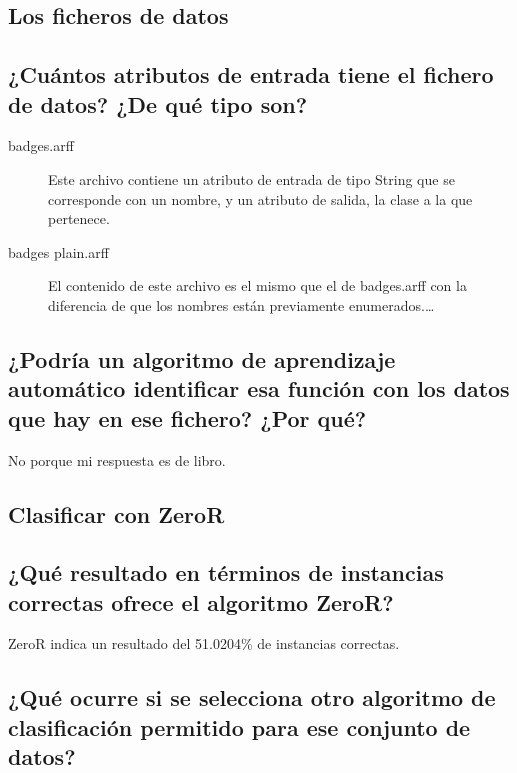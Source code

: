 \documentclass[12pt]{article}
\begin{document}
\tableofcontents

\newpage

\begin{center}
\section{Los ficheros de datos}
\end{center}

\subsection{\small ¿Cuántos atributos de entrada tiene el fichero de datos?
¿De qué tipo son?}

\begin{description}
  \item[badges.arff] Este archivo contiene un atributo de entrada de tipo String que se corresponde con un nombre, y un atributo de salida, la clase a la que pertenece.
  \item[badges plain.arff] El contenido de este archivo es el mismo que el de  badges.arff con la diferencia de que los nombres están previamente enumerados.\ldots
\end{description}

\subsection{\small ¿Podrí­a un algoritmo de aprendizaje automático identificar esa
función con los datos que hay en ese fichero? ¿Por qué?}

No porque mi respuesta es de libro.

\newpage

\begin{center}
\section{Clasificar con ZeroR}
\end{center}

\subsection{\small ¿Qué resultado en términos de instancias correctas ofrece el algoritmo
ZeroR?}

ZeroR indica un resultado del 51.0204\% de instancias correctas.

\subsection{\small ¿Qué ocurre si se selecciona otro algoritmo de clasificación permitido
para ese conjunto de datos?}
\end{document}
